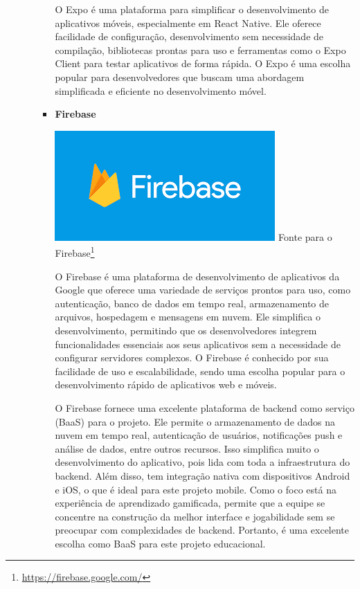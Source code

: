 \begin{itemize}
\begin{itemize}
\begin{itemize}
O Expo é uma plataforma para simplificar o desenvolvimento de aplicativos móveis, especialmente em React Native. Ele oferece facilidade de configuração, desenvolvimento sem necessidade de compilação, bibliotecas prontas para uso e ferramentas como o Expo Client para testar aplicativos de forma rápida. O Expo é uma escolha popular para desenvolvedores que buscam uma abordagem simplificada e eficiente no desenvolvimento móvel.

    \item \textbf{Firebase}
    \begin{center}
    \includegraphics[width=0.5\linewidth]{figuras/Tecnologies/Firebase.png}
    \label{fig:Firebase}
    Fonte para o Firebase\footnote{\url{https://firebase.google.com/}}
\end{center}

O Firebase é uma plataforma de desenvolvimento de aplicativos da Google que oferece uma variedade de serviços prontos para uso, como autenticação, banco de dados em tempo real, armazenamento de arquivos, hospedagem e mensagens em nuvem. Ele simplifica o desenvolvimento, permitindo que os desenvolvedores integrem funcionalidades essenciais aos seus aplicativos sem a necessidade de configurar servidores complexos. O Firebase é conhecido por sua facilidade de uso e escalabilidade, sendo uma escolha popular para o desenvolvimento rápido de aplicativos web e móveis.

O Firebase fornece uma excelente plataforma de backend como serviço (BaaS) para o projeto. Ele permite o armazenamento de dados na nuvem em tempo real, autenticação de usuários, notificações push e análise de dados, entre outros recursos. Isso simplifica muito o desenvolvimento do aplicativo, pois lida com toda a infraestrutura do backend. Além disso, tem integração nativa com dispositivos Android e iOS, o que é ideal para este projeto mobile. Como o foco está na experiência de aprendizado gamificada, permite que a equipe se concentre na construção da melhor interface e jogabilidade sem se preocupar com complexidades de backend. Portanto, é uma excelente escolha como BaaS para este projeto educacional.



\end{itemize}
\end{itemize}
\end{itemize}
